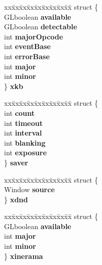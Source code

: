 \begin{DoxyCompactItemize}
\begin{tabbing}
\end{tabbing}\item 
\hypertarget{struct__GLFWlibraryX11_a6517afd4d8a31bc74d7f7e5ca39ec78a}{}\begin{tabbing}
xx\=xx\=xx\=xx\=xx\=xx\=xx\=xx\=xx\=\kill
struct \{\\
\>GLboolean {\bfseries available}\\
\>GLboolean {\bfseries detectable}\\
\>int {\bfseries majorOpcode}\\
\>int {\bfseries eventBase}\\
\>int {\bfseries errorBase}\\
\>int {\bfseries major}\\
\>int {\bfseries minor}\\
\} {\bfseries xkb}\label{struct__GLFWlibraryX11_a6517afd4d8a31bc74d7f7e5ca39ec78a}
\\

\end{tabbing}\item 
\hypertarget{struct__GLFWlibraryX11_ac11ad4b4c1e402948430dd14dbc304ab}{}\begin{tabbing}
xx\=xx\=xx\=xx\=xx\=xx\=xx\=xx\=xx\=\kill
struct \{\\
\>int {\bfseries count}\\
\>int {\bfseries timeout}\\
\>int {\bfseries interval}\\
\>int {\bfseries blanking}\\
\>int {\bfseries exposure}\\
\} {\bfseries saver}\label{struct__GLFWlibraryX11_ac11ad4b4c1e402948430dd14dbc304ab}
\\

\end{tabbing}\item 
\hypertarget{struct__GLFWlibraryX11_a957edf1ba31c910aab346003c4a53cc8}{}\begin{tabbing}
xx\=xx\=xx\=xx\=xx\=xx\=xx\=xx\=xx\=\kill
struct \{\\
\>Window {\bfseries source}\\
\} {\bfseries xdnd}\label{struct__GLFWlibraryX11_a957edf1ba31c910aab346003c4a53cc8}
\\

\end{tabbing}\item 
\hypertarget{struct__GLFWlibraryX11_a5e3369b40fee78b73a1fdc38f16fa190}{}\begin{tabbing}
xx\=xx\=xx\=xx\=xx\=xx\=xx\=xx\=xx\=\kill
struct \{\\
\>GLboolean {\bfseries available}\\
\>int {\bfseries major}\\
\>int {\bfseries minor}\\
\} {\bfseries xinerama}\label{struct__GLFWlibraryX11_a5e3369b40fee78b73a1fdc38f16fa190}
\\

\end{tabbing}\end{DoxyCompactItemize}


